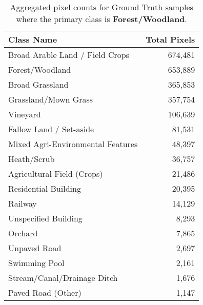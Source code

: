 \begin{table}[H] %
    \centering
    \caption{Aggregated pixel counts for Ground Truth samples where the primary class is \textbf{Forest/Woodland}.}
    \label{tab:gt_counts_10}
    \begin{tabular}{lr}
        \hline
        \textbf{Class Name} & \textbf{Total Pixels} \\
        \hline
        Broad Arable Land / Field Crops & 674,481 \\
        Forest/Woodland & 653,889 \\
        Broad Grassland & 365,853 \\
        Grassland/Mown Grass & 357,754 \\
        Vineyard & 106,639 \\
        Fallow Land / Set-aside & 81,531 \\
        Mixed Agri-Environmental Features & 48,397 \\
        Heath/Scrub & 36,757 \\
        Agricultural Field (Crops) & 21,486 \\
        Residential Building & 20,395 \\
        Railway & 14,129 \\
        Unspecified Building & 8,293 \\
        Orchard & 7,865 \\
        Unpaved Road & 2,697 \\
        Swimming Pool & 2,161 \\
        Stream/Canal/Drainage Ditch & 1,676 \\
        Paved Road (Other) & 1,147 \\
        \hline
    \end{tabular}
\end{table}


